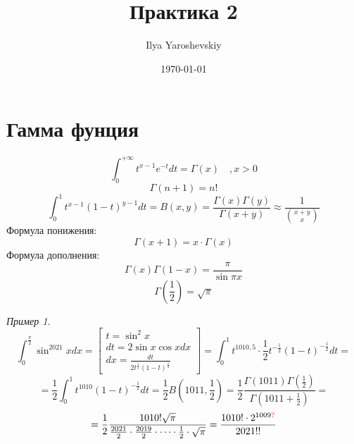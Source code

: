 \documentclass[english]{article}
\author{Ilya Yaroshevskiy}
\date{\today}
\title{Практика 2}
\theoremstyle{plain}
\theoremstyle{remark}
\newtheorem*{examp}{Пример}
\theoremstyle{definition}
\begin{document}
\maketitle
\tableofcontents


\section{Гамма фунция}
\label{sec:orgd35add2}
\[ \int_0^{ + \infty} t^{x - 1}e^{-t}dt = \Gamma(x)\quad, x > 0 \]
\[ \Gamma(n + 1) = n! \]
\[ \int_0^1 t^{x - 1}(1 - t)^{y - 1}dt = B(x, y) = \frac{\Gamma(x)\Gamma(y)}{\Gamma(x + y)} \approx \frac{1}{\binom{x + y}{x}} \]
Формула понижения: \[ \Gamma(x + 1) = x\cdot\Gamma(x) \]
Формула дополнения: \[ \Gamma(x)\Gamma(1-x) = \frac{\pi}{\sin \pi x} \]
\[ \Gamma(\frac{1}{2}) = \sqrt{\pi} \]

\begin{examp}
\[ \int_0^{\frac{\pi}{2}}\sin^{2021}x dx = \left[\begin{array}{l} t = \sin^2 x \\ dt = 2\sin x\cos x dx \\ dx = \frac{dt}{2t^{\frac{1}{2}}(1 - t)^{\frac{1}{2}}}\end{array}\right]  = \int_0^1 t^{1010,5}\cdot\frac{1}{2}t^{-\frac{1}{2}}(1 - t)^{-\frac{1}{2}}dt = \]
\[ = \frac{1}{2} \int_0^1 t^{1010}(1 - t)^{-\frac{1}{2}} dt = \frac{1}{2}B(1011, \frac{1}{2}) = \frac{1}{2}\frac{\Gamma(1011)\Gamma(\frac{1}{2})}{\Gamma(1011 + \frac{1}{2})} = \]
\[ = \frac{1}{2}\frac{1010!\sqrt{\pi}}{\frac{2021}{2}\cdot\frac{2019}{2}\cdot\dots\cdot\frac{1}{2}\cdot\sqrt{\pi}} = \frac{1010!\cdot2^{1009\color{red}?\color{black}}}{2021!!}\]
\end{examp}
\end{document}
